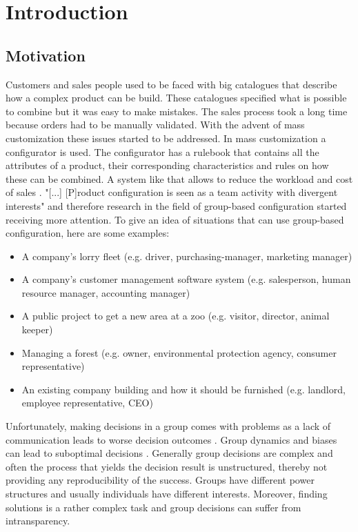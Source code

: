 \chapter{Introduction}
\label{ch:Introduction}

\section{Motivation}
\label{sec:Introduction:Goals}

Customers and sales people used to be faced with big catalogues that describe how a complex product can be build. These catalogues specified what is possible to combine but it was easy to make mistakes. The sales process took a long time because orders had to be manually validated. With the advent of mass customization these issues started to be addressed. In mass customization a configurator is used. The configurator has a rulebook that contains all the attributes of a product, their corresponding characteristics and rules on how these can be combined. A system like that allows to reduce the workload and cost of sales \cite{shafieeCostBenefitAnalysis2018}. "[...] [P]roduct configuration is seen as a team activity with divergent interests" \cite{mendoncaCollaborativeProductConfiguration2008} and therefore research in the field of group-based configuration started receiving more attention. 
To give an idea of situations that can use group-based configuration, here are some examples:
\begin{itemize}
    \item A company's lorry fleet (e.g. driver, purchasing-manager, marketing manager)
    \item A company's customer management software system (e.g. salesperson, human resource manager, accounting manager)
    \item A public project to get a new area at a zoo (e.g. visitor, director, animal keeper)
    \item Managing a forest (e.g. owner, environmental protection agency, consumer representative)
    \item An existing company building and how it should be furnished (e.g. landlord, employee representative, CEO)
\end{itemize}

Unfortunately, making decisions in a group comes with problems as a lack of communication leads to worse decision outcomes \cite{atasItemRecommendationUsing2017}. Group dynamics and biases can lead to suboptimal decisions \cite{kerrBiasJudgmentComparing1996}.
Generally group decisions are complex and often the process that yields the decision result is unstructured, thereby not providing any reproducibility of the success. Groups have different power structures and usually individuals have different interests. Moreover, finding solutions is a rather complex task and group decisions can suffer from intransparency.

